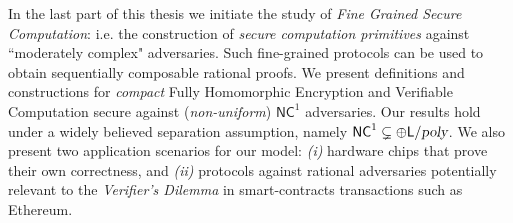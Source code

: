 
In the last part of this thesis we initiate the study of {\em Fine Grained Secure Computation}: i.e. 
the construction of {\em secure computation primitives} against ``moderately complex" adversaries. Such fine-grained protocols can be used to obtain sequentially composable rational proofs. We present definitions and constructions for \textit{compact} Fully Homomorphic Encryption and Verifiable Computation secure against (\textit{non-uniform}) $\mathsf{NC}^1$ adversaries. Our results hold under a widely believed separation assumption, namely ${\mathsf{NC}}^1 \subsetneq \oplus {\ensuremath{\mathsf{L}}} / {\textsl{poly}}$. We also present two application scenarios for our model: \textit{(i)} hardware chips that prove their own correctness, and \textit{(ii)} protocols against rational adversaries potentially relevant to the {\em Verifier's Dilemma} in smart-contracts transactions such as Ethereum. 

%
%
%
%
